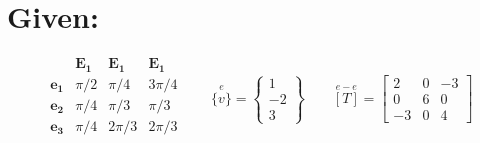 \documentclass[10pt, letterpaper]{article}
\begin{document}
\section{Given:}
	\begin{equation*}
		\begin{matrix}			& \bm{E_1} 	& \bm{E_1} 	& \bm{E_1} \\
					\bm{e_1}	& \pi / 2		& \pi / 4		& 3 \pi / 4	\\
					\bm{e_2}	& \pi / 4		& \pi / 3		& \pi / 3 \\
					\bm{e_3}	& \pi / 4		& 2 \pi / 3		& 2 \pi / 3\\ 
					\end{matrix} \qquad 
				\overset{e}{\{v\}} = \begin{Bmatrix} 1 \\ -2 \\ 3 \end{Bmatrix} \qquad
				\overset{e-e}{[T]} = \begin{bmatrix}
					 2 & 0 & -3 \\
					0 & 6 & 0 \\
					-3 & 0 & 4 \end{bmatrix}	\end{equation*}
\end{document}
